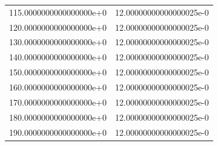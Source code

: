 \begin{table}
\begin{tabular}{|S[round-precision = 0]|S[round-precision = 3]|}
    115.0000000000000000e+0 & 12.00000000000000025e-0\\
    120.0000000000000000e+0 & 12.00000000000000025e-0\\
    130.0000000000000000e+0 & 12.00000000000000025e-0\\
    140.0000000000000000e+0 & 12.00000000000000025e-0\\
    150.0000000000000000e+0 & 12.00000000000000025e-0\\
    160.0000000000000000e+0 & 12.00000000000000025e-0\\
    170.0000000000000000e+0 & 12.00000000000000025e-0\\
    180.0000000000000000e+0 & 12.00000000000000025e-0\\
    190.0000000000000000e+0 & 12.00000000000000025e-0\\
    \bottomrule
  \end{tabular}
\end{table}


